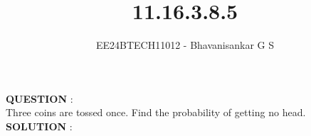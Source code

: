 \documentclass[journal]{IEEEtran}
\begin{document}

\vspace{3cm}

\title{11.16.3.8.5}
\author{EE24BTECH11012 - Bhavanisankar G S}
{\let\newpage\relax\maketitle}

\renewcommand{\thefigure}{\theenumi}
\renewcommand{\thetable}{\theenumi}
\setlength{\intextsep}{10pt} %


\renewcommand{\thetable}{\theenumi}

\textbf{QUESTION} : \\
Three coins are tossed once. Find the probability of getting no head.\\
\textbf{SOLUTION} : \\
\end{document}
